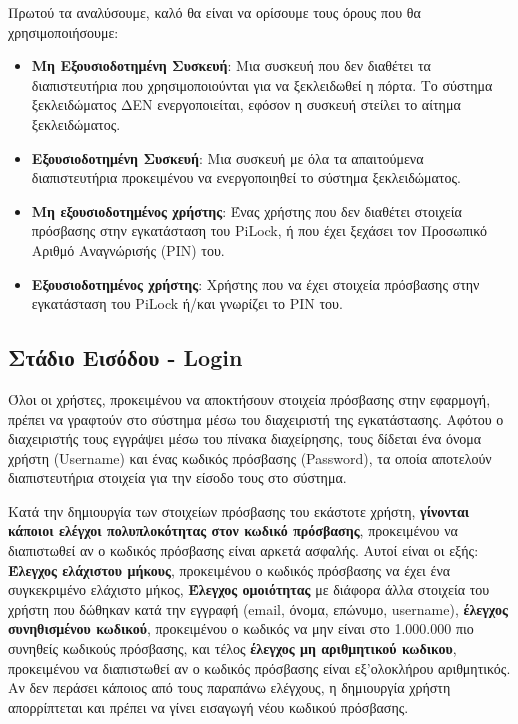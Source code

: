 	Πρωτού τα αναλύσουμε, καλό θα είναι να ορίσουμε τους όρους που θα χρησιμοποιήσουμε:
	\begin{itemize}
		\item \textbf{Μη Εξουσιοδοτημένη Συσκευή}: Μια συσκευή που δεν διαθέτει τα διαπιστευτήρια που χρησιμοποιούνται για να ξεκλειδωθεί η πόρτα. Το σύστημα ξεκλειδώματος ΔΕΝ ενεργοποιείται, εφόσον η συσκευή στείλει το αίτημα ξεκλειδώματος.
		\item \textbf{Εξουσιοδοτημένη Συσκευή}: Μια συσκευή με όλα τα απαιτούμενα διαπιστευτήρια προκειμένου να ενεργοποιηθεί το σύστημα ξεκλειδώματος.
		\item \textbf{Μη εξουσιοδοτημένος χρήστης}: Ένας χρήστης που δεν διαθέτει στοιχεία πρόσβασης στην εγκατάσταση του PiLock, ή που έχει ξεχάσει τον Προσωπικό Αριθμό Αναγνώρισής (PIN) του.
		\item \textbf{Εξουσιοδοτημένος χρήστης}: Χρήστης που να έχει στοιχεία πρόσβασης στην εγκατάσταση του PiLock ή/και γνωρίζει το PIN του.
	\end{itemize}

	\subsection{Στάδιο Εισόδου - Login}
		Όλοι οι χρήστες, προκειμένου να αποκτήσουν στοιχεία πρόσβασης στην εφαρμογή, πρέπει να γραφτούν στο σύστημα μέσω του διαχειριστή της εγκατάστασης. Αφότου ο διαχειριστής τους εγγράψει μέσω του πίνακα διαχείρησης, τους δίδεται ένα όνομα χρήστη (Username) και ένας κωδικός πρόσβασης (Password), τα οποία αποτελούν διαπιστευτήρια στοιχεία για την είσοδο τους στο σύστημα.

		Κατά την δημιουργία των στοιχείων πρόσβασης του εκάστοτε χρήστη, \textbf{γίνονται κάποιοι ελέγχοι πολυπλοκότητας στον κωδικό πρόσβασης}, προκειμένου να διαπιστωθεί αν ο κωδικός πρόσβασης είναι αρκετά ασφαλής. Αυτοί είναι οι εξής: \textbf{Έλεγχος ελάχιστου μήκους}, προκειμένου ο κωδικός πρόσβασης να έχει ένα συγκεκριμένο ελάχιστο μήκος, \textbf{Έλεγχος ομοιότητας} με διάφορα άλλα στοιχεία του χρήστη που δώθηκαν κατά την εγγραφή (email, όνομα, επώνυμο, username), \textbf{έλεγχος συνηθισμένου κωδικού}, προκειμένου ο κωδικός να μην είναι στο 1.000.000 πιο συνηθείς κωδικούς πρόσβασης, και τέλος \textbf{έλεγχος μη αριθμητικού κωδικου}, προκειμένου να διαπιστωθεί αν ο κωδικός πρόσβασης είναι εξ'ολοκλήρου αριθμητικός. Αν δεν περάσει κάποιος από τους παραπάνω ελέγχους, η δημιουργία χρήστη απορρίπτεται και πρέπει να γίνει εισαγωγή νέου κωδικού πρόσβασης.


